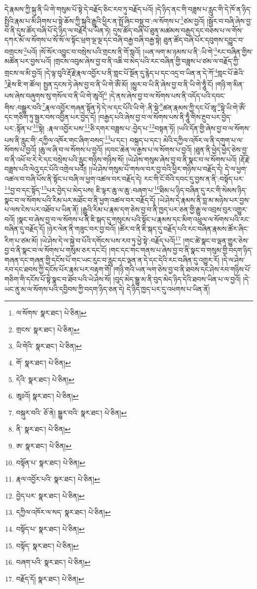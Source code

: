 དེ་རྣམས་ཀྱི་སྐུ་ནི་ཡི་གེ་གསུམ་པོ་སྟེ་དེ་བརྗོད་ཅིང་རབ་ཏུ་བརྗོད་པའོ། །དེ་ཉིད་ནང་གི་བཟླས་པ་རླུང་གི་དེ་ཁོ་ན་ཉིད་སྤྱིའི་རྣམ་པ་མི་ཤིགས་པ་སྟེ་ཆོས་ཀྱི་སྐུའི་རྒྱུའི་ཕྱིར་ན་སྤྲོ་ཞིང་བསྡུ་བ་:ལ་སོགས་པ་\footnote{ལ་སོགས་  སྣར་ཐང་།  པེ་ཅིན། }ཙམ་བྱའོ། །སྦྱོར་བ་བཞི་ཞེས་བྱ་བ་ནི་དུས་ཚོད་བཞི་པོ་དེ་ཉིད་ལ་བརྗོད་པ་ཡིན་ཏེ། དུས་ཚོད་བཞི་པོ་ཐུན་མཚམས་བརྒྱད་དང་བཅས་པ་ལ་གོས་དཀར་མོ་ལ་སོགས་པ་སོ་སོ་ལ་སྟོང་ཕྲག་ལྔ་ལྔ་དང་བཞི་བརྒྱ་བཞི་བརྒྱ་སྟེ། ཐུན་ཚོད་བཞི་པོར་དབུགས་དབྱུང་བ་བགྲངས་\footnote{གྲངས་  སྣར་ཐང་།  པེ་ཅིན། }པའོ། །སོ་སོར་འབྱུང་བ་བསྲེས་པའི་གྲངས་ནི་གོ་སླའོ། །ཡན་ལག་མ་ཉམས་པ་ནི་:ཡི་གེ་\footnote{ཡི་གེའི་  སྣར་ཐང་།  པེ་ཅིན། }རང་བཞིན་གྱིས་མཚོན་པར་བྱས་པའོ། །གྲངས་འབུམ་ཞེས་བྱ་བ་ནི་འཆི་བ་མེད་པའི་རང་བཞིན་གྱི་བཟླས་པ་ཙམ་ལ་བརྗོད་ཀྱི་གྲངས་ལ་མི་བྱའོ། །དེ་ལྟ་བུའི་རྡོ་རྗེ་རྣལ་འབྱོར་པ་ནི་གླང་པོ་སྔོན་དུ་རྙེད་པ་དང་འདྲ་བ་ཡིན་ན་དེ་ཀོ་\footnote{གོ་  སྣར་ཐང་།  པེ་ཅིན། }གླང་པོ་ཆེའི་\footnote{དེའི་  སྣར་ཐང་།  པེ་ཅིན། }རྗེས་ཇི་ག་ཚོལ། སྤྱན་དྲངས་ཏེ་ཞེས་བྱ་བ་ནི་ཡི་གེ་ཨོཾ་མོ། །མྱུར་བ་ཡི་ནི་ཞེས་བྱ་བ་ནི་ཡི་གེ་ཧཱུྃ་ངོ། །གཉི་ག་མིན་པས་ཞེས་བཞུགས་སུ་གསོལ་བ་ནི་ཡི་གེ་ཨཱའོ།\footnote{ཨཱཿའོ།  སྣར་ཐང་།  པེ་ཅིན། } །དེ་ནས་ཞེས་བྱ་བ་ལ་སོགས་པས་ནི་འདོད་པའི་དབང་གིས་:བསྒྱུར་བའི་\footnote{བསྐུར་བའི་  ཅོ་ནེ། སྒྱུར་བའི་  སྣར་ཐང་།  པེ་ཅིན། }རྣལ་འབྱོར་གཞན་སྟོན་ཏེ་དེ་ལ་དང་པོའི་ཡི་གེ་:ནི་སྡེ་\footnote{ནི་  སྣར་ཐང་།  པེ་ཅིན། }ཚན་རྣམས་ཀྱི་དང་པོ་ཨཱ་\footnote{ཨ་  སྣར་ཐང་།  པེ་ཅིན། }སྟེ་ཡི་གེ་ཨོཾ་དང་གཅིག་ཏུ་སྦྱར་བས་འབྱིན་པར་བྱེད་དོ། །བརྒྱད་པའི་ཞེས་བྱ་བ་ལ་སོགས་པས་ནི་ཧཱུྃ་གིས་རྔུབ་པར་བྱེད་པར་:སྟོན་པ་\footnote{བསྟོན་པ་  སྣར་ཐང་།  པེ་ཅིན། }སྟེ། :རྣལ་འབྱོར་པས་\footnote{རྣལ་འབྱོར་པའི་  སྣར་ཐང་།  པེ་ཅིན། }ཅི་དགར་བཟླས་པ་:བྱེད་པ་\footnote{བྱེད་པར་  སྣར་ཐང་།  པེ་ཅིན། }བསྟན་ཏོ། །ཡའི་དོན་གྱི་ཞེས་བྱ་བ་ལ་སོགས་པས་ནི་རླུང་གི་:དཀྱིལ་འཁོར་གང་ཞིག་བསད་\footnote{དཀྱིལ་འཁོར་ལ་སད་  སྣར་ཐང་།  པེ་ཅིན། }པ་དང་། བསྐྲད་པ་དང་། མེའི་དཀྱིལ་འཁོར་ལ་ནི་དགུག་པ་ལ་སོགས་པ་བྱའོ། །ཆུ་ལ་ཞི་བ་ལ་སོགས་པ་བྱའོ། །དབང་ཆེན་ལ་རྒྱས་པ་ལ་སོགས་པ་བྱའོ། །ཐུན་ནི་ཕྱེད་ཕྱེད་ཅེས་བྱ་བ་ནི་འཕོ་བ་རེ་རེ་དང་བསྲེས་པའི་རླུང་གཉིས་གཉིས་སོ། །ཡེ་ཤེས་གསུམ་ཞེས་བྱ་བ་ནི་སྣང་བ་ལ་སོགས་པའོ། །རྡོ་རྗེ་བཟླས་པའི་ལེའུ་དང་པོའི་འགྲེལ་པའོ།། །།ཡེ་ཤེས་གསུམ་པོ་གསལ་བར་བྱ་བའི་ཕྱིར་གཉིས་པ་བརྗོད་དེ། དེ་ལ་ཕྱག་འཚལ་བ་བཞི་པོས་ནི་སྟོང་པ་བཞི་ལ་ཕྱག་འཚལ་བར་བརྗོད་དེ། རང་གི་ངོ་བོའི་དབང་དུ་བྱས་ན་ནི་:བསྟོད་པར་\footnote{བསྟོད་པ་  སྣར་ཐང་།  པེ་ཅིན། }བྱ་བ་དང་སྟོད་\footnote{བསྟོད་  སྣར་ཐང་།  པེ་ཅིན། }པར་བྱེད་པ་མེད་པས། ཇི་ལྟར་ཆུ་ལ་ཆུ་:བཞག་པ་\footnote{བཞག་པའི་  སྣར་ཐང་།  པེ་ཅིན། }ཐིམ་པ་ཉིད་བཞིན་དུ་རང་གི་སེམས་ཉིད་སྣང་བ་ལ་སོགས་པའི་རིམ་པར་མཐོང་བ་ནི་ཕྱག་འཚལ་བར་བརྗོད་དོ། །ཡེ་ཤེས་དེ་རྣམས་ནི་བླ་མ་མཉེས་པར་བྱས་པ་ལས་ངེས་པར་འཐོབ་པ་ཡིན་ནོ། །རྒྱུའི་རིམ་པ་རྣམ་དག་ཅེས་བྱ་བ་ནི་ཁྱད་པར་ཅན་གྱི་རྒྱུ་ལ་འབྲས་བུར་འགྱུར་བའོ། །སྣང་བ་ཞེས་བྱ་བ་ལ་སོགས་པ་ནི་ཇི་སྐད་དུ་གསུངས་པའི་སྟོང་པ་རྣམས་དང་མིག་འཕྲུལ་ལ་སོགས་པའི་རང་བཞིན་དུ་བརྗོད་དོ། །ཉེར་ལེན་ནི་གཟུང་བར་བྱ་བའོ། །ཚོར་བ་ནི་ཇི་སྐད་དུ་བརྗོད་པའི་རང་བཞིན་རྣམས་ཚོར་ཞིང་རིག་པ་ཙམ་མོ། །ཡེ་ཤེས་དེ་ལ་སྐྱེ་བ་པོའི་དགོངས་པས་རབ་ཏུ་ཕྱེ་སྟེ་:བརྗོད་པའོ།\footnote{བརྗོད་དོ།  སྣར་ཐང་།  པེ་ཅིན། } །གང་ཚེ་སྣང་བ་ལྡན་གྱུར་ཅེས་བྱ་བ་ནི་སྣང་བ་ལ་སོགས་པ་གསུམ་ཅར་དང་ངོ། །གང་དང་གང་གནས་པ་ཞེས་བྱ་བ་ནི་སྣང་བ་གསུམ་གྱི་བདག་ཉིད་གཞན་དང་གཞན་གྱི་དངོས་པོ་གང་ཡང་རུང་བ་རླུང་དང་ལྡན་ན་དེ་དང་དེའི་རང་བཞིན་དུ་འགྱུར་རོ། །དེ་ལ་ཤེས་རབ་དང་ཐབས་ཀྱི་དངོས་པོར་རྣམ་པར་བརྟག་གོ། །གཉི་གའི་ཡན་ལག་ཅེས་བྱ་བ་ནི་ཐབས་དང་ཤེས་རབ་གཉིས་པོ་གཅིག་གི་དངོས་པོ་སྟེ་སྣང་བ་ཐོབ་པའི་ཡེ་ཤེས་སོ། །བུད་མེད་སྒྱུ་མ་ནི་བུད་མེད་ཉིད་དེའི་ཐབས་ཡིན་པ་ལ་བྱའོ། །དེ་ཡང་ནུ་མ་ལ་སོགས་པའི་དབྱིབས་ཀྱི་བདག་ཉིད་ཅན་དེ། དེ་ཉིད་ཁྱད་པར་དུ་འཕགས་པ་ཡིན་ནོ། 
